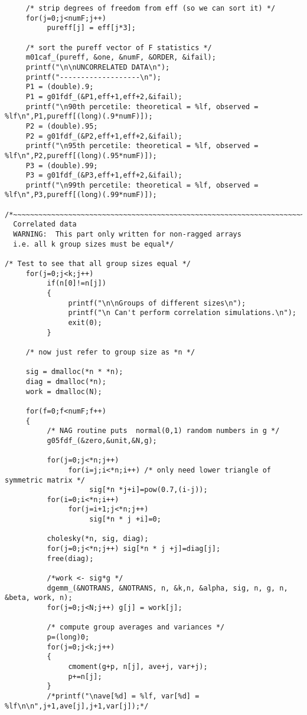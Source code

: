 \documentclass{article}
\begin{document}
\begin{verbatim}
     /* strip degrees of freedom from eff (so we can sort it) */
     for(j=0;j<numF;j++)
          pureff[j] = eff[j*3];

     /* sort the pureff vector of F statistics */
     m01caf_(pureff, &one, &numF, &ORDER, &ifail);     
     printf("\n\nUNCORRELATED DATA\n");
     printf("-------------------\n");
     P1 = (double).9;
     P1 = g01fdf_(&P1,eff+1,eff+2,&ifail);
     printf("\n90th percetile: theoretical = %lf, observed = %lf\n",P1,pureff[(long)(.9*numF)]);
     P2 = (double).95;
     P2 = g01fdf_(&P2,eff+1,eff+2,&ifail);
     printf("\n95th percetile: theoretical = %lf, observed = %lf\n",P2,pureff[(long)(.95*numF)]);
     P3 = (double).99;
     P3 = g01fdf_(&P3,eff+1,eff+2,&ifail);
     printf("\n99th percetile: theoretical = %lf, observed = %lf\n",P3,pureff[(long)(.99*numF)]);

/*~~~~~~~~~~~~~~~~~~~~~~~~~~~~~~~~~~~~~~~~~~~~~~~~~~~~~~~~~~~~~~~~~~~~~~
  Correlated data
  WARNING:  This part only written for non-ragged arrays
  i.e. all k group sizes must be equal*/

/* Test to see that all group sizes equal */
     for(j=0;j<k;j++)
          if(n[0]!=n[j])
          {
               printf("\n\nGroups of different sizes\n");
               printf("\n Can't perform correlation simulations.\n");
               exit(0);
          }

     /* now just refer to group size as *n */
     
     sig = dmalloc(*n * *n);
     diag = dmalloc(*n);
     work = dmalloc(N);

     for(f=0;f<numF;f++)
     {
          /* NAG routine puts  normal(0,1) random numbers in g */
          g05fdf_(&zero,&unit,&N,g);

          for(j=0;j<*n;j++) 
               for(i=j;i<*n;i++) /* only need lower triangle of symmetric matrix */
                    sig[*n *j+i]=pow(0.7,(i-j));
          for(i=0;i<*n;i++)
               for(j=i+1;j<*n;j++) 
                    sig[*n * j +i]=0;

          cholesky(*n, sig, diag);
          for(j=0;j<*n;j++) sig[*n * j +j]=diag[j]; 
          free(diag);

          /*work <- sig*g */
          dgemm_(&NOTRANS, &NOTRANS, n, &k,n, &alpha, sig, n, g, n, &beta, work, n);      
          for(j=0;j<N;j++) g[j] = work[j];
          
          /* compute group averages and variances */
          p=(long)0;
          for(j=0;j<k;j++)
          {
               cmoment(g+p, n[j], ave+j, var+j);  
               p+=n[j];
          }
          /*printf("\nave[%d] = %lf, var[%d] = %lf\n\n",j+1,ave[j],j+1,var[j]);*/
               

\end{verbatim}
\end{document}
